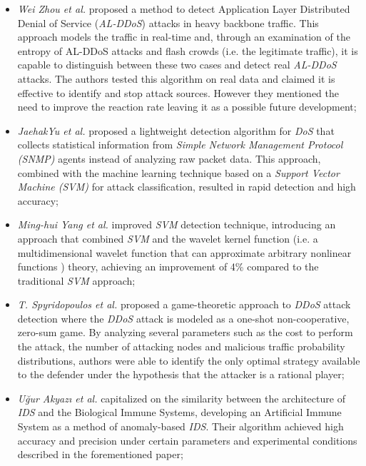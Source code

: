 \begin{itemize}
\item \emph{Wei Zhou et al.} \cite{zhou2014detection} proposed a method to detect Application Layer Distributed Denial of Service (\emph{AL-DDoS}) attacks in heavy backbone traffic. This approach models the traffic in real-time and, through an examination of the entropy of AL-DDoS attacks and flash crowds (i.e. the legitimate traffic), it is capable to distinguish between these two cases and detect real \emph{AL-DDoS} attacks. The authors tested this algorithm on real data and claimed it is effective to identify and stop attack sources. However they mentioned the need to improve the reaction rate leaving it as a possible future development;
\item \emph{JaehakYu et al.} \cite{yu2008traffic} proposed a lightweight detection algorithm for \emph{DoS} that collects statistical information from \emph{Simple Network Management Protocol (SNMP)} agents instead of analyzing raw packet data. This approach, combined with the machine learning technique based on a \emph{Support Vector Machine (SVM)} for attack classification, resulted in rapid detection and high accuracy;
\item \emph{Ming-hui Yang et al.} \cite{yang2008ddos} improved \emph{SVM} detection technique, introducing an approach that combined \emph{SVM} and the wavelet kernel function (i.e. a multidimensional wavelet function that can approximate arbitrary nonlinear functions \cite{zhang2004wavelet}) theory, achieving an improvement of 4\% compared to the traditional \emph{SVM} approach;
\item \emph{T. Spyridopoulos et al.} \cite{spyridopoulos2013game} proposed a game-theoretic approach to \emph{DDoS} attack detection where the \emph{DDoS} attack is modeled as a one-shot non-cooperative, zero-sum game. By analyzing several parameters such as the cost to perform the attack, the number of attacking nodes and malicious traffic probability distributions, authors were able to identify the only optimal strategy available to the defender under the hypothesis that the attacker is a rational player;
\item \emph{Uğur Akyazı et al.} \cite{akyazi2010detection} capitalized on the similarity between the architecture of \emph{IDS} and the Biological Immune Systems, developing an Artificial Immune System as a method of anomaly-based \emph{IDS}. Their algorithm achieved high accuracy and precision under certain parameters and experimental conditions described in the forementioned paper;

\end{itemize}
